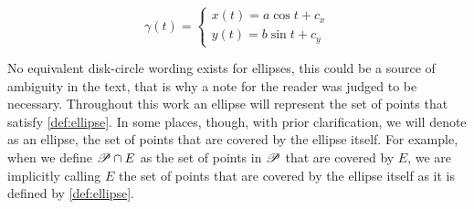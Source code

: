     \begin{equation}\label{eq:parametric_ellipse}
    \gamma(t) = \left\{
    \begin{array}{l}
    x(t)= a\cos{t} + c_x\\
    y(t)=b\sin{t} + c_y
    \end{array}
    \right.
    \end{equation}

No equivalent disk-circle wording exists for ellipses, this could be a source of ambiguity in the text, that is why a note for the reader was judged to be necessary. Throughout this work an ellipse will represent the set of points that satisfy \autoref{def:ellipse}. In some places, though, with prior clarification, we will denote as an ellipse, the set of points that are covered by the ellipse itself. For example, when we define $\mathscr{P} \cap E$ as the set of points in $\mathscr{P}$ that are covered by $E$, we are implicitly calling $E$ the set of points that are covered by the ellipse itself as it is defined by \autoref{def:ellipse}.